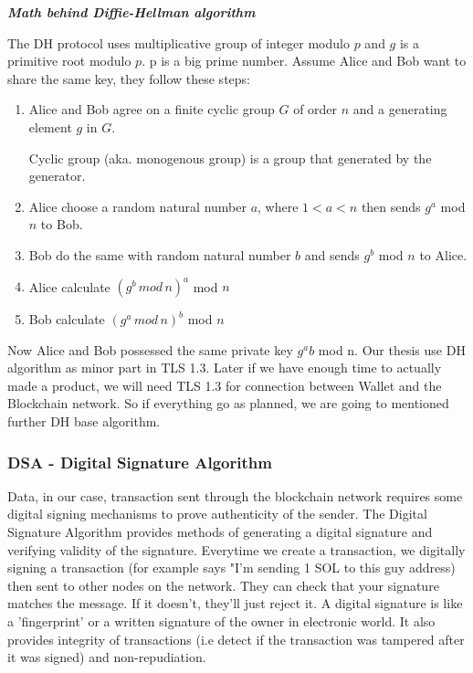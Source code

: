 \bigskip
{\textit {\textbf{Math behind Diffie-Hellman algorithm}}}

The DH protocol uses multiplicative group of integer modulo $p$ and $g$ is a primitive root modulo $p$.
p is a big prime number.
Assume Alice and Bob want to share the same key, they follow these steps:
\begin{enumerate}
  \item Alice and Bob agree on a finite cyclic group $G$ of order $n$ and a generating element $g$ in $G$.
        \begin{definition}
          Cyclic group (aka. monogenous group) is a group that generated by the generator.
        \end{definition}
  \item Alice choose a random natural number $a$, where $1 < a < n$ then sends $g^a$ mod $n$ to Bob.
  \item Bob do the same with random natural number $b$ and sends $g^b$ mod $n$ to Alice.
  \item Alice calculate $(g^b \, mod \, n)^a$ mod $n$
  \item Bob calculate $(g^a \, mod \, n)^b$ mod $n$
\end{enumerate}
Now Alice and Bob possessed the same private key $g^ab$ mod n.
Our thesis use DH algorithm as minor part in TLS 1.3.
Later if we have enough time to actually made a product, we will need TLS 1.3 for connection between Wallet and the Blockchain network.
So if everything go as planned, we are going to mentioned further DH base algorithm.

\subsubsection{DSA - Digital Signature Algorithm}
Data, in our case, transaction sent through the blockchain network requires some digital signing mechanisms to prove authenticity of the sender.
The Digital Signature Algorithm provides methods of generating a digital signature and verifying validity of the signature.
Everytime we create a transaction, we digitally signing a transaction (for example says "I'm sending 1 SOL to this guy address) then sent to other nodes on the network.
They can check that your signature matches the message. If it doesn’t, they’ll just reject it.
A digital signature is like a 'fingerprint' or a written signature of the owner in electronic world.
It also provides integrity of transactions (i.e detect if the transaction was tampered after it was signed) and non-repudiation.

